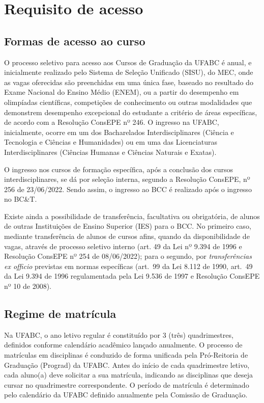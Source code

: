 \section{Requisito de acesso}
\label{sec:acesso}

\subsection{Formas de acesso ao curso}

O processo seletivo para acesso aos Cursos de Graduação da UFABC é
anual, e inicialmente realizado pelo Sistema de Seleção Unificado
(SISU), do MEC, onde as vagas oferecidas são preenchidas em uma única
fase, baseado no resultado do Exame Nacional do Ensino Médio (ENEM),
ou a partir do desempenho em olimpíadas científicas, competições de
conhecimento ou outras modalidades que demonstrem desempenho
excepcional do estudante a critério de áreas específicas, de acordo
com a Resolução ConsEPE nº 246.  O ingresso na UFABC, inicialmente,
ocorre em um dos Bacharelados Interdisciplinares (Ciência e Tecnologia
e Ciências e Humanidades) ou em uma das Licenciaturas
Interdisciplinares (Ciências Humanas e Ciências Naturais e Exatas).

O ingresso nos cursos de formação específica, após a conclusão dos cursos
interdisciplinares, se dá por seleção interna, segundo a Resolução ConsEPE, nº
256 de 23/06/2022.
Sendo assim, o ingresso ao BCC é realizado após o ingresso no BC\&T.

Existe ainda a possibilidade de transferência, facultativa ou obrigatória, de
alunos de outras Instituições de Ensino Superior (IES) para o BCC.
No primeiro caso, mediante transferência de alunos de cursos afins, quando da
disponibilidade de vagas, através de processo seletivo interno (art. 49 da Lei
nº 9.394 de 1996 e Resolução ConsEPE nº 254 de 08/06/2022); para o
segundo, por \textit{transferências ex officio} previstas em normas específicas
(art.\ 99 da Lei 8.112 de 1990, art.\ 49 da Lei 9.394 de 1996 regulamentada
pela Lei 9.536 de 1997 e Resolução ConsEPE nº 10 de 2008).

\subsection{Regime de matrícula}

Na UFABC, o ano letivo regular é constituído por 3 (três) quadrimestres,
definidos conforme calendário acadêmico lançado anualmente.
O processo de matrículas em disciplinas é conduzido de forma unificada pela
Pró-Reitoria de Graduação (Prograd) da UFABC.
Antes do início de cada quadrimestre letivo, cada aluno(a) deve solicitar a sua
matrícula, indicando as disciplinas que deseja cursar no quadrimestre
correspondente.
O período de matrícula é determinado pelo calendário da UFABC definido
anualmente pela Comissão de Graduação.

